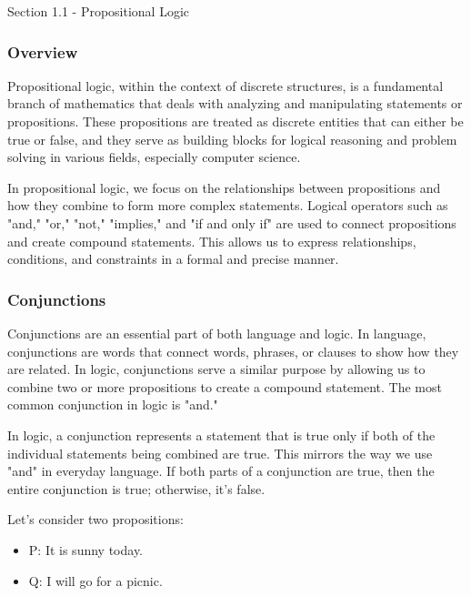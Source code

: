 \begin{notes}{Section 1.1 - Propositional Logic}

    \subsubsection*{Overview}

    Propositional logic, within the context of discrete structures, is a fundamental branch of mathematics that deals with analyzing and manipulating statements or propositions. These propositions are 
    treated as discrete entities that can either be true or false, and they serve as building blocks for logical reasoning and problem solving in various fields, especially computer science.

    In propositional logic, we focus on the relationships between propositions and how they combine to form more complex statements. Logical operators such as "and," "or," "not," "implies," and "if and 
    only if" are used to connect propositions and create compound statements. This allows us to express relationships, conditions, and constraints in a formal and precise manner.

    \subsubsection*{Conjunctions}

    Conjunctions are an essential part of both language and logic. In language, conjunctions are words that connect words, phrases, or clauses to show how they are related. In logic, conjunctions serve 
    a similar purpose by allowing us to combine two or more propositions to create a compound statement. The most common conjunction in logic is "and."

    In logic, a conjunction represents a statement that is true only if both of the individual statements being combined are true. This mirrors the way we use "and" in everyday language. If both parts of a 
    conjunction are true, then the entire conjunction is true; otherwise, it's false.

    \begin{Highlight}
        Let's consider two propositions:

        \begin{itemize}
            \item P: It is sunny today.
            \item Q: I will go for a picnic.
        \end{itemize}


\end{Highlight}
\end{notes}

